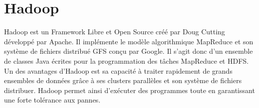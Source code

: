 \section{Hadoop}
Hadoop est un Framework Libre et Open Source créé par Doug Cutting développé par Apache. Il implémente le modèle algorithmique MapReduce et son système de fichiers distribué GFS conçu par Google. Il s’agit donc d’un ensemble de classes Java écrites pour la programmation des tâches MapReduce et HDFS. Un des avantages d’Hadoop est sa capacité à traiter rapidement de grands ensembles de données grâce à ses clusters parallèles et son système de fichiers distribuer. Hadoop permet ainsi d’exécuter des programmes toute en garantissant une forte tolérance aux pannes. \cite{borthakur_hadoop_2005} \cite{jolia-ferrier_livre_nodate}